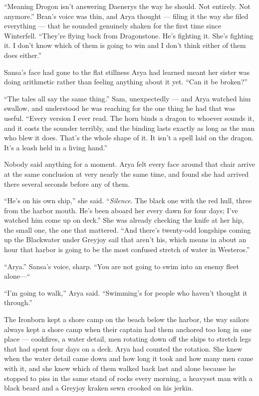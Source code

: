 “Meaning Drogon isn’t answering Daenerys the way he should. Not entirely. Not anymore.” Bran’s voice was thin, and Arya thought — filing it the way she filed everything — that he sounded genuinely shaken for the first time since Winterfell. “They’re flying back from Dragonstone. He’s fighting it. She’s fighting it. I don’t know which of them is going to win and I don’t think either of them does either.”

Sansa’s face had gone to the flat stillness Arya had learned meant her sister was doing arithmetic rather than feeling anything about it yet. “Can it be broken?”

“The tales all say the same thing.” Sam, unexpectedly — and Arya watched him swallow, and understood he was reaching for the one thing he had that was useful. “Every version I ever read. The horn binds a dragon to whoever sounds it, and it costs the sounder terribly, and the binding lasts exactly as long as the man who blew it does. That’s the whole shape of it. It isn’t a spell laid on the dragon. It’s a leash held in a living hand.”

Nobody said anything for a moment. Arya felt every face around that chair arrive at the same conclusion at very nearly the same time, and found she had arrived there several seconds before any of them.

“He’s on his own ship,” she said. “\textit{Silence}. The black one with the red hull, three from the harbor mouth. He’s been aboard her every dawn for four days; I’ve watched him come up on deck.” She was already checking the knife at her hip, the small one, the one that mattered. “And there’s twenty-odd longships coming up the Blackwater under Greyjoy sail that aren’t his, which means in about an hour that harbor is going to be the most confused stretch of water in Westeros.”

“Arya.” Sansa’s voice, sharp. “You are not going to swim into an enemy fleet alone—“

“I’m going to walk,” Arya said. “Swimming’s for people who haven’t thought it through.”

\sceneBreak

The Ironborn kept a shore camp on the beach below the harbor, the way sailors always kept a shore camp when their captain had them anchored too long in one place — cookfires, a water detail, men rotating down off the ships to stretch legs that had spent four days on a deck. Arya had counted the rotation. She knew when the water detail came down and how long it took and how many men came with it, and she knew which of them walked back last and alone because he stopped to piss in the same stand of rocks every morning, a heavyset man with a black beard and a Greyjoy kraken sewn crooked on his jerkin.

